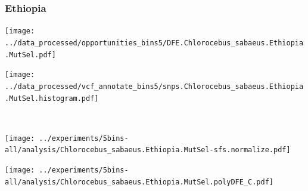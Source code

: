 \subsubsection{Ethiopia}

\begin{minipage}{0.49\linewidth}
    \texttt{[image: ../data\_processed/opportunities\_bins5/DFE.Chlorocebus\_sabaeus.Ethiopia.MutSel.pdf]}
\end{minipage}
\begin{minipage}{0.49\linewidth}
    \texttt{[image: ../data\_processed/vcf\_annotate\_bins5/snps.Chlorocebus\_sabaeus.Ethiopia.MutSel.histogram.pdf]}
\end{minipage}
\\
\begin{minipage}{0.49\linewidth}
    \texttt{[image: ../experiments/5bins-all/analysis/Chlorocebus\_sabaeus.Ethiopia.MutSel-sfs.normalize.pdf]}
\end{minipage}
\begin{minipage}{0.4\linewidth}
    \texttt{[image: ../experiments/5bins-all/analysis/Chlorocebus\_sabaeus.Ethiopia.MutSel.polyDFE\_C.pdf]}
\end{minipage}
